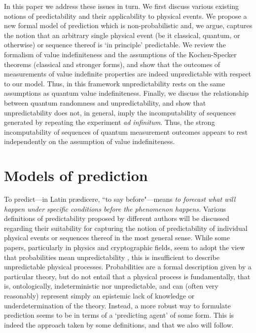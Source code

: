 \documentclass[%
 superscriptaddress,
 preprint,
 showpacs,
 showkeys,
 preprintnumbers,
 nofootinbib,
  amsmath,amssymb,
  aps,
 pra,
  longbibliography,
  floatfix,
 ]{revtex4-1}
\theoremstyle{definition}
\begin{document}
In this paper we address these issues in turn.
We first discuss various existing notions of predictability and their applicability to physical events.
We propose a new formal model of prediction which is non-probabilistic and, we argue, captures the notion that an arbitrary single physical event (be it classical, quantum, or otherwise) or sequence thereof is `in principle' predictable.
We review the formalism of value indefiniteness and the assumptions of the Kochen-Specker theorems (classical and stronger forms), and show that the outcomes of measurements of value indefinite properties are indeed unpredictable with respect to our model.
Thus, in this framework unpredictability  rests on the same assumptions as quantum value indefiniteness.
Finally, we discuss the relationship between quantum randomness and unpredictability, and show that unpredictability does not, in general, imply the incomputability of sequences generated by repeating the experiment \emph{ad infinitum}.
Thus, the strong incomputability of sequences of quantum measurement outcomes appears to rest independently on the assumption of value indefiniteness.


\section{Models of prediction}

To predict---in  Latin pr{\ae}dicere, ``to say before"---means \emph{to forecast what will happen under specific conditions before the phenomenon happens.}
Various definitions of predictability  proposed by different authors will be discussed regarding their suitability for capturing the notion of predictability of individual physical events or sequences thereof in the most general sense.
While some papers, particularly in physics and cryptographic fields, seem to adopt the view that probabilities mean unpredictability \cite{Acin:2013qa,zeil-05_nature_ofQuantum}, this is insufficient to describe unpredictable physical processes.
Probabilities are a formal description given by a particular theory, but do not entail that a physical process is fundamentally, that is, ontologically, indeterministic nor unpredictable, and can (often very reasonably) represent simply an epistemic lack of knowledge or underdetermination of the theory.
Instead, a more robust way to formulate prediction seems to be in terms of a `predicting agent' of some form.
This is indeed the approach taken by some definitions, and that we also will follow.
\end{document}
